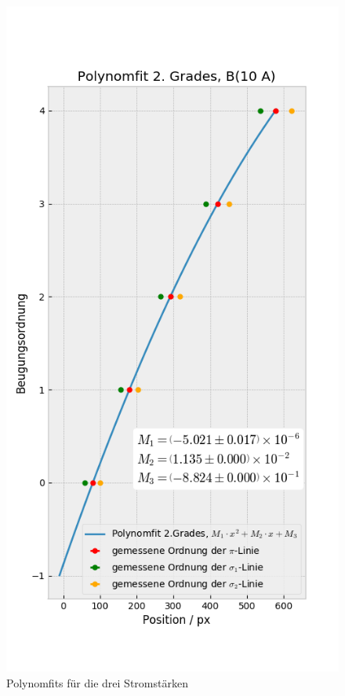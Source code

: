         \begin{landscape}
          \thispagestyle{empty}
          \begin{figure}
            \vspace*{-2cm}
            \caption{Polynomfits für die drei Stromstärken}
            \label{plot::3}
            \hspace*{-5cm}
            \includegraphics[width=.45\paperwidth]{Auswertung/scatterorder/sco_10A}

\end{figure}
\end{landscape}
